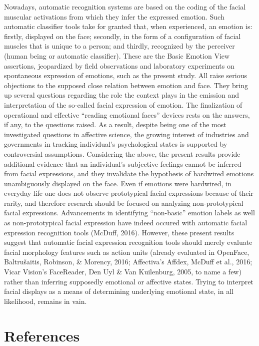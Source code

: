 \documentclass[
  english,
  doc]{apa7}
\begin{document}
Nowadays, automatic recognition systems are based on the coding of the facial muscular activations from which they infer the expressed emotion. Such automatic classifier tools take for granted that, when experienced, an emotion is: firstly, displayed on the face; secondly, in the form of a configuration of facial muscles that is unique to a person; and thirdly, recognized by the perceiver (human being or automatic classifier). These are the Basic Emotion View assertions, jeopardized by field observations and laboratory experiments on spontaneous expression of emotions, such as the present study. All raise serious objections to the supposed close relation between emotion and face. They bring up several questions regarding the role the context plays in the emission and interpretation of the so-called facial expression of emotion. The finalization of operational and effective ``reading emotional faces'' devices rests on the answers, if any, to the questions raised. As a result, despite being one of the most investigated questions in affective science, the growing interest of industries and governments in tracking individual's psychological states is supported by controversial assumptions. Considering the above, the present results provide additional evidence that an individual's subjective feelings cannot be inferred from facial expressions, and they invalidate the hypothesis of hardwired emotions unambiguously displayed on the face. Even if emotions were hardwired, in everyday life one does not observe prototypical facial expressions because of their rarity, and therefore research should be focused on analyzing non-prototypical facial expressions. Advancements in identifying ``non-basic'' emotion labels as well as non-prototypical facial expression have indeed occured with automatic facial expression recognition tools (McDuff, 2016). However, these present results suggest that automatic facial expression recognition tools should merely evaluate facial morphology features such as action units (already evaluated in OpenFace, Baltrušaitis, Robinson, \& Morency, 2016; Affectiva's Affdex, McDuff et al., 2016; Vicar Vision's FaceReader, Den Uyl \& Van Kuilenburg, 2005, to name a few) rather than inferring supposedly emotional or affective states. Trying to interpret facial displays as a means of determining underlying emotional state, in all likelihood, remains in vain.

\newpage

\hypertarget{references}{%
\section{References}\label{references}}
\end{document}
